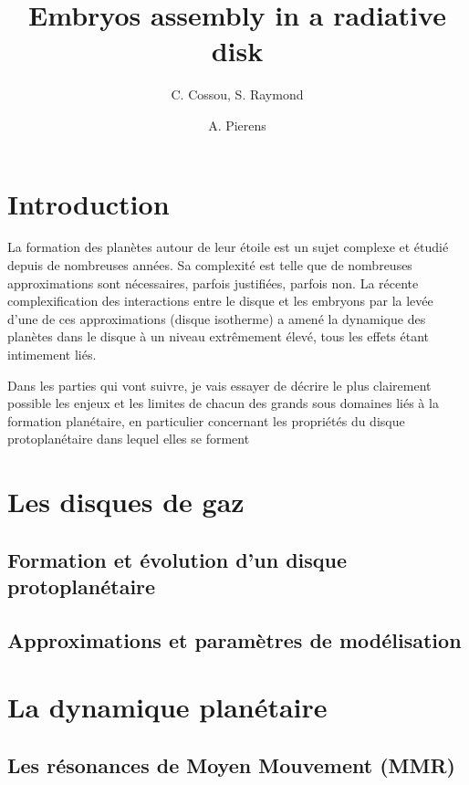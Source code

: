 \documentclass[a4paper,twoside]{article}
\title{Embryos assembly in a radiative disk}
\author{C. Cossou, S. Raymond \and A. Pierens}
\begin{document}
\tableofcontents
\newpage

\section{Introduction}
La formation des planètes autour de leur étoile est un sujet complexe et étudié depuis de nombreuses années. Sa complexité est telle que de nombreuses approximations sont nécessaires, parfois justifiées, parfois non. La récente complexification des interactions entre le disque et les embryons par la levée d'une de ces approximations (disque isotherme) a amené la dynamique des planètes dans le disque à un niveau extrêmement élevé, tous les effets étant intimement liés. 

Dans les parties qui vont suivre, je vais essayer de décrire le plus clairement possible les enjeux et les limites de chacun des grands sous domaines liés à la formation planétaire, en particulier concernant les propriétés du disque protoplanétaire dans lequel elles se forment

\section{Les disques de gaz}
\subsection{Formation et évolution d'un disque protoplanétaire}

\subsection{Approximations et paramètres de modélisation}


\section{La dynamique planétaire}
\subsection{Les résonances de Moyen Mouvement (MMR)}
\end{document}
